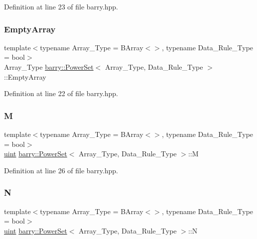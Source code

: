 Definition at line 23 of file barry.\+hpp.

\mbox{\label{classbarry_1_1_power_set_a7709618ce9c3d9346499c7b23b91392a}} 
\subsubsection{\texorpdfstring{Empty\+Array}{EmptyArray}}
{\footnotesize\ttfamily template$<$typename Array\+\_\+\+Type  = B\+Array$<$$>$, typename Data\+\_\+\+Rule\+\_\+\+Type  = bool$>$ \\
Array\+\_\+\+Type \hyperlink{classbarry_1_1_power_set}{barry\+::\+Power\+Set}$<$ Array\+\_\+\+Type, Data\+\_\+\+Rule\+\_\+\+Type $>$\+::Empty\+Array}



Definition at line 22 of file barry.\+hpp.

\mbox{\label{classbarry_1_1_power_set_ae64182a21f9969a2c9fdf73ab23a6c5e}} 
\subsubsection{\texorpdfstring{M}{M}}
{\footnotesize\ttfamily template$<$typename Array\+\_\+\+Type  = B\+Array$<$$>$, typename Data\+\_\+\+Rule\+\_\+\+Type  = bool$>$ \\
\hyperlink{namespacebarry_a11dfc53ddb4672278319aa04f1e09a6c}{uint} \hyperlink{classbarry_1_1_power_set}{barry\+::\+Power\+Set}$<$ Array\+\_\+\+Type, Data\+\_\+\+Rule\+\_\+\+Type $>$\+::M}



Definition at line 26 of file barry.\+hpp.

\mbox{\label{classbarry_1_1_power_set_adea0f6434b17b3fc391475a11db00c2f}} 
\subsubsection{\texorpdfstring{N}{N}}
{\footnotesize\ttfamily template$<$typename Array\+\_\+\+Type  = B\+Array$<$$>$, typename Data\+\_\+\+Rule\+\_\+\+Type  = bool$>$ \\
\hyperlink{namespacebarry_a11dfc53ddb4672278319aa04f1e09a6c}{uint} \hyperlink{classbarry_1_1_power_set}{barry\+::\+Power\+Set}$<$ Array\+\_\+\+Type, Data\+\_\+\+Rule\+\_\+\+Type $>$\+::N}



